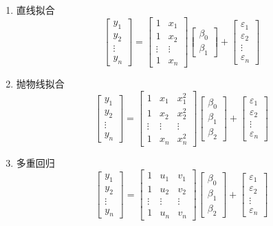 \begin{enumerate}
	\itemsep -3pt
	\item 直线拟合
	\[\begin{bmatrix}y_1\\y_2\\\vdots\\y_n\end{bmatrix}=\begin{bmatrix}1&x_1\\1&x_2\\\vdots&\vdots\\1&x_n\end{bmatrix}\begin{bmatrix}\beta_0\\\beta_1\end{bmatrix}+\begin{bmatrix}\varepsilon_1\\\varepsilon_2\\\vdots\\\varepsilon_n\end{bmatrix}\]
	\item 抛物线拟合
	\[\begin{bmatrix}y_1\\y_2\\\vdots\\y_n\end{bmatrix}=\begin{bmatrix}1&x_1&x_1^2\\1&x_2&x_2^2\\\vdots&\vdots&\vdots\\1&x_n&x_n^2\end{bmatrix}\begin{bmatrix}\beta_0\\\beta_1\\\beta_2\end{bmatrix}+\begin{bmatrix}\varepsilon_1\\\varepsilon_2\\\vdots\\\varepsilon_n\end{bmatrix}\]
	\item 多重回归
	\[\begin{bmatrix}y_1\\y_2\\\vdots\\y_n\end{bmatrix}=\begin{bmatrix}1&u_1&v_1\\1&u_2&v_2\\\vdots&\vdots&\vdots\\1&u_n&v_n\end{bmatrix}\begin{bmatrix}\beta_0\\\beta_1\\\beta_2\end{bmatrix}+\begin{bmatrix}\varepsilon_1\\\varepsilon_2\\\vdots\\\varepsilon_n\end{bmatrix}\]
\end{enumerate}


